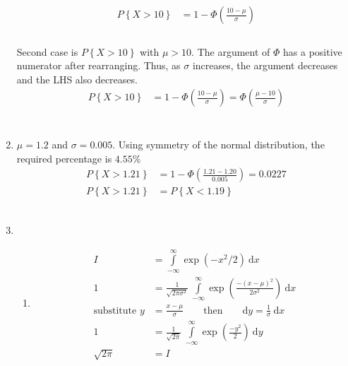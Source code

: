\begin{enumerate}
		\begin{align}
			P \left\{X > 10\right\} &= 1 - \Phi\left(\frac{10 - \mu}{\sigma}\right)\nonumber \\
		\end{align}\\
		
		Second case is $ P \left\{X > 10\right\} $ with $ \mu > 10 $. The argument of $ \Phi $ has a positive numerator after rearranging. Thus, as $ \sigma $ increases, the argument decreases and the LHS also decreases.\\
		
		\begin{align}
			P \left\{X > 10\right\} &= 1 - \Phi\left(\frac{10 - \mu}{\sigma}\right)\nonumber = \Phi\left(\frac{\mu - 10}{\sigma}\right)\nonumber \\
		\end{align}\\
	
	
	\item 
	
		$ \mu = 1.2$ and $\sigma = 0.005$. Using symmetry of the normal distribution, the required percentage is $ 4.55\%$\\
		
		\begin{align}
			P \left\{X > 1.21\right\} &= 1 - \Phi\left(\frac{1.21 - 1.20}{0.005}\right) = 0.0227 \nonumber \\
			P \left\{X > 1.21\right\} &= P \left\{X < 1.19\right\}
		\end{align}\\
		
	
	
	\item 
			
		\begin{enumerate}
			\item \begin{align}
				I &= \int\limits_{-\infty}^{\infty} \exp(-x^2/2) \ \mathrm{d}x \nonumber \\
				1 &= \frac{1}{\sqrt{2\pi\sigma^2}}\ \int\limits_{-\infty}^{\infty} \exp\left(\frac{-(x-\mu)^2}{2 \sigma^2}\right) \ \mathrm{d}x \nonumber \\
				\text{substitute } y &= \frac{x-\mu}{\sigma} \qquad \text{then} \qquad \mathrm{d}y = \frac{1}{\sigma} \ \mathrm{d}x \nonumber \\
				1 &= \frac{1}{\sqrt{2\pi}}\ \int\limits_{-\infty}^{\infty} \exp\left(\frac{-y^2}{2}\right) \ \mathrm{d}y \nonumber \\
				\sqrt{2\pi} &= I
			\end{align}\\
			

\end{enumerate}
\end{enumerate}
